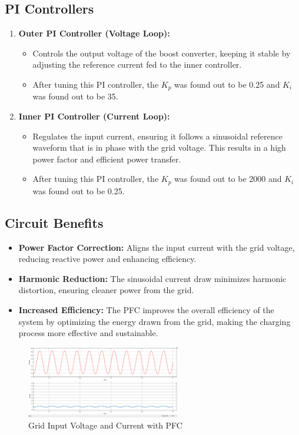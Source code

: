 \documentclass[12pt]{article}
\begin{document}
\subsection*{PI Controllers}
\begin{enumerate}
    \item \textbf{Outer PI Controller (Voltage Loop):}
    \begin{itemize}
        \item Controls the output voltage of the boost converter, keeping it stable by adjusting the reference current fed to the inner controller.
        \item  After tuning this PI controller, the \( K_p \) was found out to be 0.25 and \( K_i \) was found out to be 35.

    \end{itemize}
    \item \textbf{Inner PI Controller (Current Loop):}
    \begin{itemize}
        \item Regulates the input current, ensuring it follows a sinusoidal reference waveform that is in phase with the grid voltage. This results in a high power factor and efficient power transfer.
        \item  After tuning this PI controller, the \( K_p \) was found out to be 2000 and \( K_i \) was found out to be 0.25.

    \end{itemize}
\end{enumerate}

\subsection*{Circuit Benefits}
\begin{itemize}
    \item \textbf{Power Factor Correction:} Aligns the input current with the grid voltage, reducing reactive power and enhancing efficiency.
    \item \textbf{Harmonic Reduction:} The sinusoidal current draw minimizes harmonic distortion, ensuring cleaner power from the grid.
    \item \textbf{Increased Efficiency:} The PFC improves the overall efficiency of the system by optimizing the energy drawn from the grid, making the charging process more effective and sustainable.
\end{itemize}
\begin{figure}[h]
    \centering
    \includegraphics[width=0.6\textwidth]{img/InputVnI.png}
    \caption{Grid Input Voltage and Current with PFC}
\end{figure}
\end{document}

